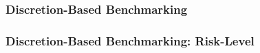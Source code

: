 \documentclass{beamer}
\begin{document}
\begin{frame}
  \frametitle{Discretion-Based Benchmarking}
\end{frame}


\begin{frame}
  \frametitle{Discretion-Based Benchmarking: Risk-Level}
\end{frame}




  

\end{document}
